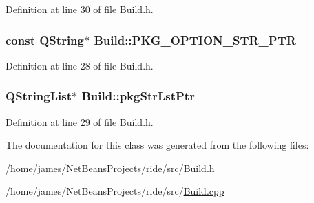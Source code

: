 Definition at line 30 of file Build.\-h.

\hypertarget{class_build_a32d97560bba88abe53398fdebcb4ddcf}{
\subsubsection[{P\-K\-G\-\_\-\-O\-P\-T\-I\-O\-N\-\_\-\-S\-T\-R\-\_\-\-P\-T\-R}]{\setlength{\rightskip}{0pt plus 5cm}const Q\-String$\ast$ Build\-::\-P\-K\-G\-\_\-\-O\-P\-T\-I\-O\-N\-\_\-\-S\-T\-R\-\_\-\-P\-T\-R\hspace{0.3cm}{\ttfamily [private]}}}\label{class_build_a32d97560bba88abe53398fdebcb4ddcf}


Definition at line 28 of file Build.\-h.

\hypertarget{class_build_af980a5b63ef5778e733cc4d29064be7e}{
\subsubsection[{pkg\-Str\-Lst\-Ptr}]{\setlength{\rightskip}{0pt plus 5cm}Q\-String\-List$\ast$ Build\-::pkg\-Str\-Lst\-Ptr\hspace{0.3cm}{\ttfamily [private]}}}\label{class_build_af980a5b63ef5778e733cc4d29064be7e}


Definition at line 29 of file Build.\-h.



The documentation for this class was generated from the following files\-:\begin{DoxyCompactItemize}
\item 
/home/james/\-Net\-Beans\-Projects/ride/src/\hyperlink{_build_8h}{Build.\-h}\item 
/home/james/\-Net\-Beans\-Projects/ride/src/\hyperlink{_build_8cpp}{Build.\-cpp}\end{DoxyCompactItemize}

